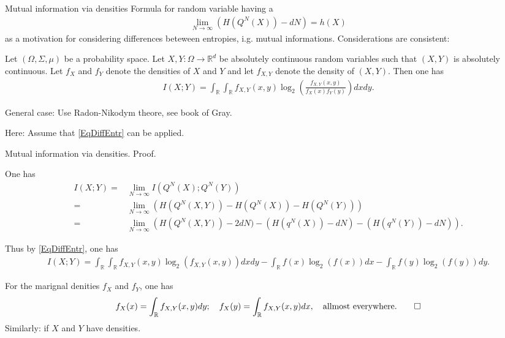 \begin{frame}{Mutual information via densities}
 Formula for random variable having a  
\begin{align}\label{EqDiffEntr}
\lim_{N\to \infty}\left(H(Q^N(X))-dN\right)=h(X) 
\end{align}
as a motivation for considering 
differences beteween entropies, i.g. mutual informations. Considerations are consistent: 
\begin{proposition}
Let $(\Omega,\Sigma,\mu)$ be a probability space. Let $X, Y:\Omega\to \mathbb{R}^d$ be absolutely continuous random variables such that $(X,Y)$ is absolutely continuous. Let $f_X$ and 
$f_Y$ denote the densities of $X$ and $Y$ and let $f_{X,Y}$ denote the density of $(X,Y)$. Then one has 
\begin{align}\label{FormulaMIIntegral}
I(X;Y)=\int_{\mathbb{R}}\int_{\mathbb{R}}f_{X,Y}(x,y)\log_2\left(\frac{f_{X,Y}(x,y)}{f_X(x)f_Y(y)}\right)dxdy. 
\end{align}
\end{proposition}
\vspace{-0.2cm}
\vspace{-0.1cm}
\bit    
\item General case: Use Radon-Nikodym theore, see book of Gray.
\item Here:  Assume that \eqref{EqDiffEntr} can be applied.
\eit
\end{frame}

\begin{frame}{Mutual information via densities. Proof.}
\bit
\item One has
\begin{align*}
I(X;Y)=&\lim_{N\to\infty}I(Q^{N}(X);Q^N(Y))\\
=&\lim_{N\to\infty}\left(H(Q^{N}(X,Y))-H(Q^{N}(X))-H(Q^{N}(Y))\right)\\
=&\lim_{N\to\infty}\left(H(Q^{N}(X,Y))-2dN)-(H(q^{N}(X))-dN)-(H(q^{N}(Y))-dN)\right).
\end{align*}
\item
Thus by \eqref{EqDiffEntr}, one has 
\begin{align*}
I(X;Y)
=\int_{\mathbb{R}}\int_{\mathbb{R}}f_{X,Y}(x,y)\log_2(f_{X,Y}(x,y))dxdy-
\int_{\mathbb{R}}f(x)\log_2(f(x))dx-\int_{\mathbb{R}}f(y)\log_2(f(y))dy. 
\end{align*}
\item For the marignal denities $f_X$ and $f_Y$, one has
\begin{align*}
f_X(x)=\int_{\mathbb{R}}f_{X,Y}(x,y)dy;\quad f_X(y)=\int_{\mathbb{R}}f_{X,Y}(x,y)dx,\quad\text{allmost everywhere.}\qed
\end{align*} 
\eit
Similarly:  if $X$ and $Y$ have densities. 
\end{frame}


